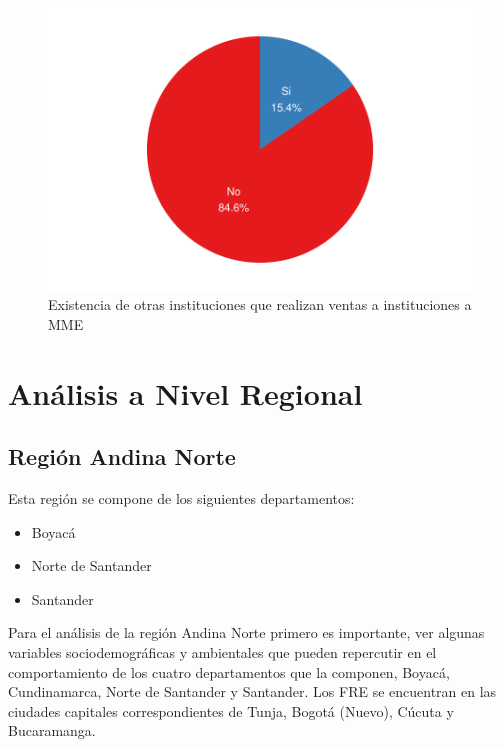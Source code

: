 \documentclass[
]{book}
\providecommand{\tightlist}{%
  \setlength{\itemsep}{0pt}\setlength{\parskip}{0pt}}
\begin{document}
\begin{figure}
\includegraphics[width=0.85\linewidth]{InformeFinal_files/figure-latex/InstitucionesAdicionales-1} \caption{Existencia de otras instituciones que realizan ventas a instituciones a MME}\label{fig:InstitucionesAdicionales}
\end{figure}

\hypertarget{anuxe1lisis-a-nivel-regional}{%
\chapter{Análisis a Nivel Regional}\label{anuxe1lisis-a-nivel-regional}}

\hypertarget{regiuxf3n-andina-norte}{%
\section{Región Andina Norte}\label{regiuxf3n-andina-norte}}

Esta región se compone de los siguientes departamentos:

\begin{itemize}
\tightlist
\item
  Boyacá
\item
  Norte de Santander
\item
  Santander
\end{itemize}

Para el análisis de la región Andina Norte primero es importante, ver algunas variables sociodemográficas y ambientales que pueden repercutir en el comportamiento de los cuatro departamentos que la componen, Boyacá, Cundinamarca, Norte de Santander y Santander. Los FRE se encuentran en las ciudades capitales correspondientes de Tunja, Bogotá (Nuevo), Cúcuta y Bucaramanga.
\end{document}
